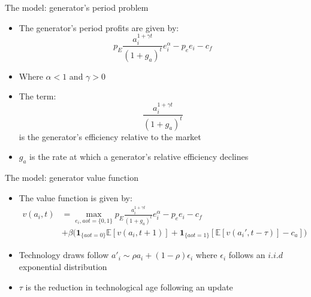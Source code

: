\documentclass{beamer}
\begin{document}
\begin{frame}{The model: generator's period problem}\label{gen_problem}
\begin{itemize}
\item The generator's period profits are given by:
\begin{equation*}
    p_E\frac{a_{i}^{1+\gamma t}}{(1+g_a)^t} e_i^\alpha -p_e e_i-c_f
\end{equation*}

\item Where $\alpha<1$ and $\gamma>0$
 \item The term: \begin{equation*}
     \frac{a_{i}^{1+\gamma t}}{(1+g_a)^t}
 \end{equation*} is the generator's efficiency relative to the market
 \item $g_a$ is the rate at which a generator's relative efficiency declines
    
\end{itemize}

 \hyperlink{intra_period}{}  
 \hyperlink{alt_model}{}   
  \hyperlink{effic_between_model}{}
  \hyperlink{rel_eff_why}{}
  \hyperlink{coal_gas}{}  

    
\end{frame}
\begin{frame}{The model: generator value function}\label{value_fn}
\begin{itemize}
\item The value function is given by:
\begin{align*} 
    v(a_{i},t) &= \max_{e_i,aot=\{0,1\}} p_E\frac{a_{i}^{1+\gamma t}}{(1+g_a)^t} e_i^\alpha -p_e e_i-c_f\\ 
    &+\beta \big(\mathbf{1}_{\{aot =0\}} \mathbb{E}[v(a_{i},t+1)] + \mathbf{1}_{\{aot =1\}}[ \mathbb{E}[v(a_{i}',t-\tau)]-c_a]\big)
\end{align*}
\hfill\break
    \item Technology draws follow $a'_i\sim \rho a_i + (1-\rho)\epsilon_i$ where $\epsilon_i$ follows an $i.i.d$ exponential distribution
     \item $\tau$ is the reduction in technological age following an update
    
\end{itemize}

 \hyperlink{intra_period}{}  
 \hyperlink{alt_model}{}   
  \hyperlink{effic_between_model}{}
  \hyperlink{rel_eff_why}{}
\hyperlink{coal_gas}{}    
    
\end{frame}
\end{document}
